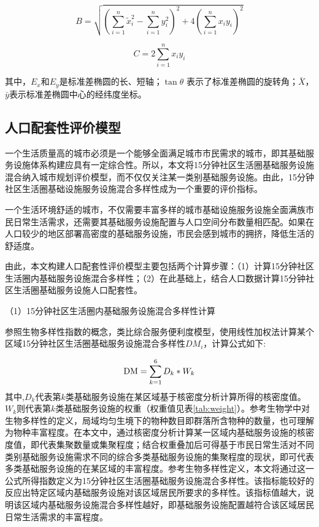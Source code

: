 \documentclass{shnuthesis}
\begin{document}
\begin{equation}
	B=\sqrt{\left(\sum_{i=1}^{n} \tilde{x}_{i}^{2}-\sum_{i=1}^{n} y_{i}^{2}\right)^{2}+4\left(\sum_{i=1}^{n} x_{i} y_{i}\right)^{2}}
\end{equation}

\begin{equation}
	C=2 \sum_{i=1}^{n} x_{i} y_{i}
\end{equation}

其中，$E_x$和$E_y$是标准差椭圆的长、短轴；$\tan \theta$ 表示了标准差椭圆的旋转角；$\bar{X}$，$\bar{y}$表示标准差椭圆中心的经纬度坐标。 

\subsection{人口配套性评价模型}

一个生活质量高的城市必须是一个能够全面满足城市市民需求的城市，即其基础服务设施体系构建应具有一定综合性。所以，本文将15分钟社区生活圈基础服务设施混合纳入城市规划评价模型，而不仅仅关注某一类别基础服务设施。由此，15分钟社区生活圈基础设施服务设施混合多样性成为一个重要的评价指标\textsuperscript{\cite{li2019b}}。

一个生活环境舒适的城市，不仅需要丰富多样的城市基础设施服务设施全面满族市民日常生活需求，还需要其基础服务设施配置与人口空间分布数量相匹配。如果在人口较少的地区部署高密度的基础服务设施，市民会感到城市的拥挤，降低生活的舒适度。

由此，本文构建人口配套性评价模型主要包括两个计算步骤：（1）计算15分钟社区生活圈内基础服务设施混合多样性；（2）在此基础上，结合人口数据计算15分钟社区生活圈基础服务设施人口配套性。

（1）15分钟社区生活圈内基础服务设施混合多样性计算

参照生物多样性指数的概念，类比综合服务便利度模型，使用线性加权法计算某个区域15分钟社区生活圈基础服务设施混合多样性${DM}_{i}$，计算公式如下:  

\begin{equation}{\label{eqn:diversity}}
	\mathrm{DM}=\sum_{k=1}^{6} D_{k} * W_{k}
\end{equation}
\newline
其中,$D_k$代表第$k$类基础服务设施在某区域基于核密度分析计算所得的核密度值。$W_k$则代表第$k$类基础服务设施的权重（权重值见表\ref{tab:weight}）。参考生物学中对生物多样性的定义，局域均匀生境下的物种数目即群落所含物种的数量，也可理解为物种丰富程度。在本文中，通过核密度分析计算某一区域内基础服务设施的核密度值，即代表集聚数量或集聚程度；结合权重叠加后可得基于市民日常生活对不同类别基础服务设施需求不同的综合多类基础服务设施的集聚程度的现状，即可代表多类基础服务设施的在某区域的丰富程度。参考生物多样性定义，本文将通过这一公式所得指数定义为15分钟社区生活圈基础服务设施混合多样性。该指标能较好的反应出特定区域内基础服务设施对该区域居民所要求的多样性。该指标值越大，说明该区域内基础服务设施混合多样性越好，即基础服务设施配置越符合该区域居民日常生活需求的丰富程度。
\end{document}
